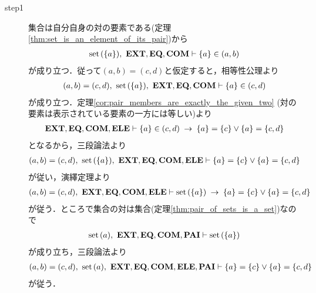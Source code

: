 	\begin{sketch}\mbox{}
		\begin{description}
			\item[step1] 集合は自分自身の対の要素である(定理\ref{thm:set_is_an_element_of_its_pair})から
				\begin{align}
					\operatorname*{set}\hspace{0.15em}(\{a\}),\ \mbox{{\bf EXT}},\mbox{{\bf EQ}},\mbox{\bf COM} \vdash \{a\} \in (a,b)
				\end{align}
				が成り立つ．従って$(a,b) = (c,d)$と仮定すると，相等性公理より
				\begin{align}
					(a,b) = (c,d),\ \operatorname*{set}\hspace{0.15em}(\{a\}),\ \mbox{{\bf EXT}},\mbox{{\bf EQ}},\mbox{\bf COM} \vdash \{a\} \in (c,d)
				\end{align}
				が成り立つ．定理\ref{cor:pair_members_are_exactly_the_given_two}
				(対の要素は表示されている要素の一方には等しい)より
				\begin{align}
					\mbox{{\bf EXT}},\mbox{{\bf EQ}},\mbox{\bf COM},\mbox{{\bf ELE}} \vdash \{a\} \in (c,d) \hspace{0.25em}\rightarrow\hspace{0.25em} \{a\} = \{c\} \vee \{a\} = \{c,d\}
					\label{fom:equality_of_ordered_pairs_1}
				\end{align}
				となるから，三段論法より
				\begin{align}
					(a,b) = (c,d),\ \set{\{a\}},\ \EXTAX,\EQAX,\COMAX,\ELEAX \vdash \{a\} = \{c\} \vee \{a\} = \{c,d\}
				\end{align}
				が従い，演繹定理より
				\begin{align}
					(a,b) = (c,d),\ \mbox{{\bf EXT}},\mbox{{\bf EQ}},\mbox{\bf COM},\mbox{{\bf ELE}} \vdash
					\operatorname*{set}\hspace{0.15em}(\{a\}) \hspace{0.25em}\rightarrow\hspace{0.25em} \{a\} = \{c\} \vee \{a\} = \{c,d\}
				\end{align}
				が従う．ところで集合の対は集合(定理\ref{thm:pair_of_sets_is_a_set})なので
				\begin{align}
					\operatorname*{set}\hspace{0.15em}(a),\ \mbox{{\bf EXT}},\mbox{{\bf EQ}},\mbox{\bf COM},\mbox{{\bf PAI}} \vdash \operatorname*{set}\hspace{0.15em}(\{a\})
				\end{align}
				が成り立ち，三段論法より
				\begin{align}
					(a,b) = (c,d),\ \set{a},\ \EXTAX,\EQAX,\COMAX,\ELEAX,\PAIAX \vdash \{a\} = \{c\} \vee \{a\} = \{c,d\}
					\label{fom:equality_of_ordered_pairs_2}
				\end{align}
				が従う．	
		

\end{description}
\end{sketch}
